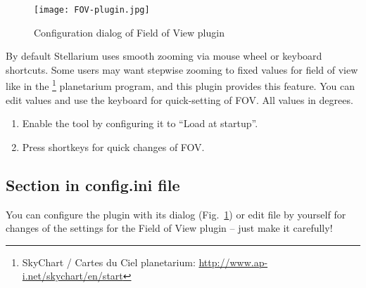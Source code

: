 \begin{figure}[ht]
\texttt{[image: FOV-plugin.jpg]}
\label{fig:plugins:FieldOfView}
\caption{Configuration dialog of Field of View plugin}
\end{figure}

\noindent By default Stellarium uses smooth zooming via mouse wheel or
keyboard shortcuts. Some users may want stepwise zooming to fixed
values for field of view like in the \footnote{SkyChart / Cartes du Ciel planetarium:
  \url{http://www.ap-i.net/skychart/en/start}} planetarium program,
and this plugin provides this feature. You can edit values and use the
keyboard for quick-setting of FOV. All values in degrees.


\begin{enumerate}
\item Enable the tool by configuring it to ``Load at startup''.
\item Press shortkeys for quick changes of FOV.
\end{enumerate}

\subsection{Section  in config.ini file}
\label{sec:plugins:FieldOfView:config}

You can configure the plugin with its dialog (Fig.~\ref{fig:plugins:FieldOfView}) or edit
 file by yourself for changes of the settings for the
Field of View plugin -- just make it carefully!

